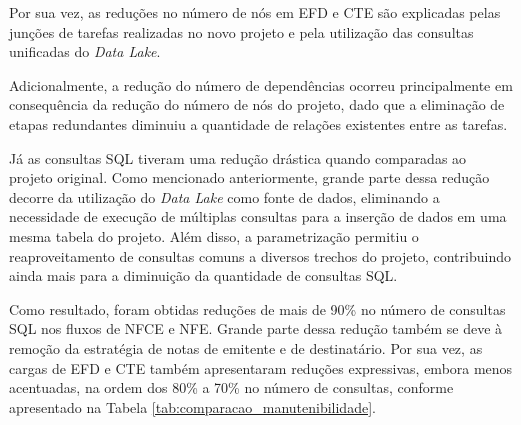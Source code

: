 Por sua vez, as reduções no número de nós em EFD e CTE são explicadas pelas junções de tarefas
realizadas no novo projeto e pela utilização das consultas unificadas do \textit{Data Lake}.

Adicionalmente, a redução do número de dependências ocorreu principalmente em consequência da redução 
do número de nós do projeto, dado que a eliminação de etapas redundantes diminuiu a quantidade de relações 
existentes entre as tarefas. 

Já as consultas SQL tiveram uma redução drástica quando comparadas ao projeto original. Como 
mencionado anteriormente, grande parte dessa redução decorre da utilização do \textit{Data Lake} como fonte 
de dados, eliminando a necessidade de execução de múltiplas consultas para a inserção de dados em 
uma mesma tabela do projeto. Além disso, a parametrização permitiu o reaproveitamento de consultas 
comuns a diversos trechos do projeto, contribuindo ainda mais para a diminuição da quantidade de 
consultas SQL.

Como resultado, foram obtidas reduções de mais de 90\% no número de consultas SQL nos fluxos 
de NFCE e NFE. Grande parte dessa redução também se deve à remoção da estratégia de notas de 
emitente e de destinatário. Por sua vez, as cargas de EFD e CTE também apresentaram reduções expressivas, 
embora menos acentuadas, na ordem dos 80\% a 70\% no número de consultas, 
conforme apresentado na Tabela \ref{tab:comparacao_manutenibilidade}.




